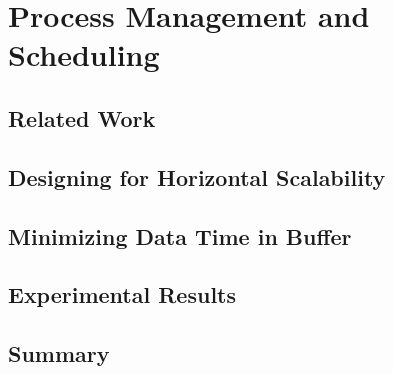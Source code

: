 \chapter{Process Management and Scheduling}
\section{Related Work}
\section{Designing for Horizontal Scalability}
\section{Minimizing Data Time in Buffer}
\section{Experimental Results}
\section{Summary}







